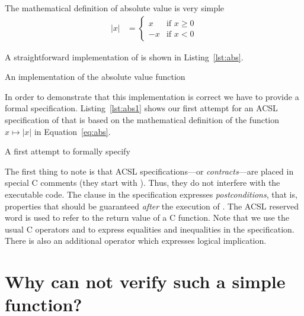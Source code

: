 The mathematical definition of absolute value is very simple
\begin{align}
\label{eq:abs}
   |x| &= \left\{
            \begin{array}{rl}
               x  & \text{if $x \geq 0$} \\
               -x & \text{if $x < 0$}
            \end{array}
          \right.
\end{align}

A straightforward implementation of  is shown in Listing~\ref{lst:abs}.

\begin{listing}[hbt]
\begin{minipage}{\textwidth}

\end{minipage}
\caption{\label{lst:abs} An implementation of the absolute value function}
\end{listing}

In order to demonstrate that this implementation is correct we have to provide
a formal specification.
Listing~\ref{lst:abs1} shows our first attempt for an ACSL specification of  that
is based on the mathematical definition of the function $x \mapsto |x|$ in Equation~\ref{eq:abs}.

\begin{listing}[hbt]
\begin{minipage}{\textwidth}

\end{minipage}
\caption{\label{lst:abs1} A first attempt to formally specify }
\end{listing}

\FloatBarrier

The first thing to note is that ACSL specifications---or \emph{contracts}---are placed in special C comments
(they start with ).
Thus, they do not interfere with the executable code.
The  clause in the specification expresses \emph{postconditions},
that is, properties that should be guaranteed \emph{after} the execution
of .
The ACSL reserved word \inl{\\result} is used to refer to the return value of a C function.
Note that we use the usual C operators \inl{==} and \inl{<=} to express equalities and inequalities
in the specification.
There is also an additional operator \inl{==>} which expresses logical implication.

\section{Why can \framacwp not verify such a simple function?}
\label{sec:framac-failure}

